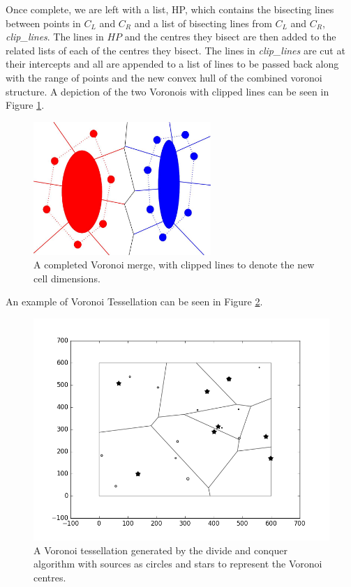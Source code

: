 Once complete, we are left with a list, HP, which contains the bisecting lines between points in $C_L$ and $C_R$ and a list of bisecting lines from $C_L$ and $C_R$, \textit{clip\_lines}. The lines in $HP$ and the centres they bisect are then added to the related lists of each of the centres they bisect. The lines in \textit{clip\_lines} are cut at their intercepts and all are appended to a list of lines to be passed back along with the range of points and the new convex hull of the combined voronoi structure. A depiction of the two Voronois with clipped lines can be seen in Figure \ref{fig:v_merge5}.
\begin{figure}[H]
\centering
\includegraphics[width=0.6\textwidth]{Images/v_merge5.jpg}
\caption{A completed Voronoi merge, with clipped lines to denote the new cell dimensions.}
\label{fig:v_merge5}
\end{figure}
An example of  Voronoi Tessellation can be seen in Figure \ref{fig:gen_voronoi}.
\begin{figure}[H]
\includegraphics[width=\textwidth]{Images/recentre1.png}
\caption{A Voronoi tessellation generated by the divide and conquer algorithm with sources as circles and stars to represent the Voronoi centres.}
\label{fig:gen_voronoi}
\end{figure}
